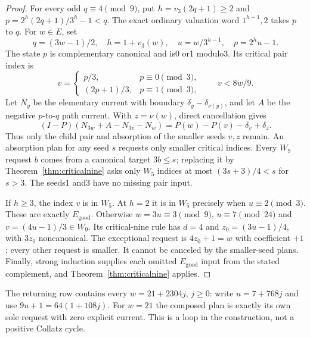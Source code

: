 \documentclass[11pt]{article}
\begin{document}
\begin{proof}
For every odd $q\equiv4\pmod9$, put $h=v_3(2q+1)\ge2$ and
$p=2^h(2q+1)/3^h-1<q$. The exact ordinary valuation word
$1^{h-1},2$ takes $p$ to $q$. For $w\in E$, set
\[
 q=(3w-1)/2,\quad h=1+v_3(w),\quad u=w/3^{h-1},\quad p=2^hu-1.
\]
The state $p$ is complementary canonical and is0 or1 modulo3. Its
critical pair index is
\[
 v=\begin{cases}p/3,&p\equiv0\pmod3,\\
 (2p+1)/3,&p\equiv1\pmod3,\end{cases}
 \qquad v<8w/9.
\]
Let $N_y$ be the elementary current with boundary
$\delta_y-\delta_{\nu(y)}$, and let $A$ be the negative $p$-to-$q$
path current. With $z=\nu(w)$, direct cancellation gives
\[
 (I-P)(N_{3w}+A-N_{3v}-N_w)
       =P(w)-P(v)-\delta_v+\delta_z.
\]
Thus only the child pair and absorption of the smaller seeds $v,z$ remain.
An absorption plan for any seed $s$ requests only smaller critical indices.
Every $W_9$ request $b$ comes from a canonical target $3b\le s$; replacing
it by Theorem~\ref{thm:criticalnine} asks only $W_5$ indices at most
$(3s+3)/4<s$ for $s>3$. The seeds1 and3 have no missing pair input.

If $h\ge3$, the index $v$ is in $W_5$. At $h=2$ it is in $W_5$ precisely
when $u\equiv2\pmod3$. These are exactly $E_{\mathrm{good}}$.
Otherwise $w=3u\equiv3\pmod9$, $u\equiv7\pmod{24}$ and
$v=(4u-1)/3\in W_9$. Its critical-nine rule has $d=4$ and
$z_0=(3u-1)/4$, with $3z_0$ noncanonical. The exceptional request is
$4z_0+1=w$ with coefficient $+1$; every other request is smaller.
It cannot be canceled by the smaller-seed plans. Finally, strong induction
supplies each omitted $E_{\mathrm{good}}$ input from the stated complement,
and Theorem~\ref{thm:criticalnine} applies.
\end{proof}

The returning row contains every $w=21+2304j$, $j\ge0$: write
$u=7+768j$ and use $9u+1=64(1+108j)$. For $w=21$ the composed plan is
exactly its own sole request with zero explicit current. This is a loop
in the construction, not a positive Collatz cycle.
\end{document}
